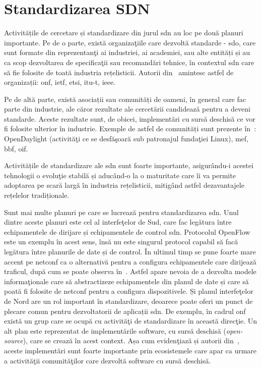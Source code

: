 \section{Standardizarea SDN}

Activitățile de cercetare și standardizare din jurul \gls{sdn} au loc pe două planuri importante. Pe de o parte, există organizaţiile care dezvoltă standarde - \gls{sdo}, care sunt formate din reprezentanţi ai industriei, ai academiei, sau alte entități și au ca scop dezvoltarea de specificaţii sau recomandări tehnice, în contextul \gls{sdn} care să fie folosite de toată industria rețelisticii. Autorii din~\cite{schneider2014standardizations} amintesc astfel de organizații: \gls{onf}, \gls{ietf}, \gls{etsi}, \gls{itu-t}, \gls{ieee}. 

Pe de altă parte, există asociații sau comunități de oameni, în general care fac parte din industrie, ale căror rezultate ale cercetării candidează pentru a deveni standarde. Aceste rezultate sunt, de obicei, implementări cu sursă deschisă ce vor fi folosite ulterior în industrie. Exemple de astfel de comunități sunt prezente în~\cite{halpern2014standards, meyer2013software}: OpenDaylight (activităţi ce se desfăşoară sub patronajul fundaţiei Linux), \gls{mef}, \gls{bbf}, \gls{oif}.

Activitățile de standardizare ale \gls{sdn} sunt foarte importante, asigurându-i acestei tehnologii o evoluţie stabilă și aducând-o la o maturitate care îi va permite adoptarea pe scară largă în industria rețelisticii, mitigând astfel dezavantajele rețelelor tradiționale.

Sunt mai multe planuri pe care se lucrează pentru standardizarea \gls{sdn}. Unul dintre aceste planuri este cel al interfeţelor de Sud, care fac legătura între echipamentele de dirijare și echipamentele de control \gls{sdn}. Protocolul OpenFlow este un exemplu în acest sens, însă nu este singurul protocol capabil să facă legătura între planurile de date și de control. În ultimul timp se pune foarte mare accent pe \gls{netconf} ca o alternativă pentru a configura echipamentele care dirijează traficul, după cum se poate observa în~\cite{csoma2015escape, felix2014multi, zhou2014research}. Astfel apare nevoia de a dezvolta modele informaţionale care să abstractizeze echipamentele din planul de date și care să poată fi folosite de \gls{netconf} pentru a configura dispozitivele. Și planul interfeţelor de Nord are un rol important în standardizare, deoarece poate oferi un punct de plecare comun pentru dezvoltatorii de aplicații \gls{sdn}. De exemplu, în cadrul \gls{onf} există un grup care se ocupă cu activităţi de standardizare în această direcţie. Un alt plan este reprezentat de implementările software, cu sursă deschisă (\textit{open-source}), care se crează în acest context. Așa cum evidenţiază și autorii din~\cite{lin2014software, rothenberg2014open}, aceste implementări sunt foarte importante prin ecosistemele care apar ca urmare a activităţii comunităţilor care dezvoltă software cu sursă deschisă.

